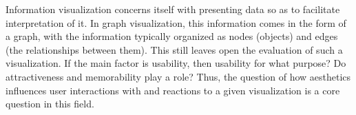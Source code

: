 \documentclass[12pt, twocolumn]{article}
\begin{document}
Information visualization concerns itself with presenting data so as to facilitate interpretation of it. 
In graph visualization, this information comes in the form of a graph, with the information typically organized as nodes (objects) and edges (the relationships between them).
This still leaves open the evaluation of such a visualization. 
If the main factor is usability, then usability for what purpose?
Do attractiveness and memorability play a role?
Thus, the question of how aesthetics influences user interactions with and reactions to a given visualization is a core question in this field. 
\\
\end{document}
